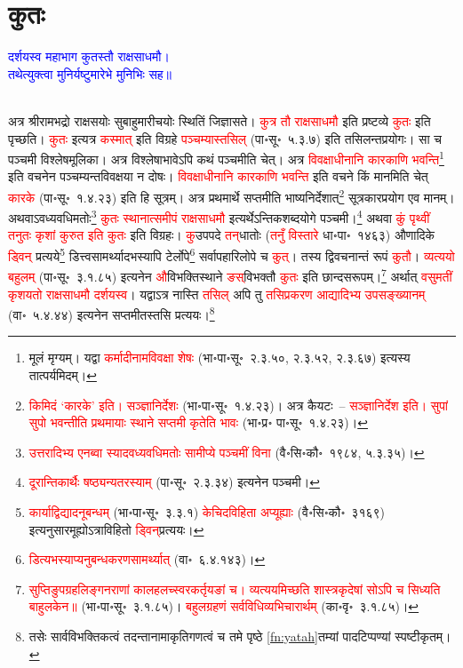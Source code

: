 \section[कुतः]{कुतः}
\centering\textcolor{blue}{दर्शयस्व महाभाग कुतस्तौ राक्षसाधमौ।\nopagebreak\\
तथेत्युक्त्वा मुनिर्यष्टुमारेभे मुनिभिः सह॥}\nopagebreak\\
\\
\begin{sloppypar}\justifying\noindent\hspace{10mm} अत्र श्रीरामभद्रो राक्षसयोः सुबाहु\-मारीचयोः स्थितिं जिज्ञासते। \textcolor{red}{कुत्र तौ राक्षसाधमौ} इति प्रष्टव्ये \textcolor{red}{कुतः} इति पृच्छति। \textcolor{red}{कुतः} इत्यत्र \textcolor{red}{कस्मात्} इति विग्रहे \textcolor{red}{पञ्चम्यास्तसिल्} (पा॰सू॰~५.३.७) इति तसिलन्त\-प्रयोगः। सा च पञ्चमी विश्लेष\-मूलिका। अत्र विश्लेषाभावेऽपि कथं पञ्चमीति चेत्। अत्र \textcolor{red}{विवक्षाधीनानि कारकाणि भवन्ति}\footnote{मूलं मृग्यम्। यद्वा \textcolor{red}{कर्मादीनामविवक्षा शेषः} (भा॰पा॰सू॰~२.३.५०, २.३.५२, २.३.६७) इत्यस्य तात्पर्यमिदम्।} इति वचनेन पञ्चम्यन्त\-विवक्षया न दोषः। \textcolor{red}{विवक्षाधीनानि कारकाणि भवन्ति} इति वचने किं मानमिति चेत् \textcolor{red}{कारके} (पा॰सू॰~१.४.२३) इति हि सूत्रम्। अत्र प्रथमार्थे सप्तमीति भाष्य\-निर्देशात्\footnote{\textcolor{red}{किमिदं ‘कारके’ इति। सञ्ज्ञानिर्देशः} (भा॰पा॰सू॰~१.४.२३)। अत्र कैयटः~– \textcolor{red}{सञ्ज्ञानिर्देश इति। सुपां सुपो भवन्तीति प्रथमायाः स्थाने सप्तमी कृतेति भावः} (भा॰प्र॰ पा॰सू॰~१.४.२३)।} सूत्रकार\-प्रयोग एव मानम्। अथवाऽवध्यवधिमतोः\footnote{\textcolor{red}{उत्तरादिभ्य एनब्वा स्यादवध्यवधिमतोः सामीप्ये पञ्चमीं विना} (वै॰सि॰कौ॰~१९८४, ५.३.३५)।} \textcolor{red}{कुतः स्थानात्समीपं राक्षसाधमौ} इत्यर्थेऽन्तिक\-शब्द\-योगे पञ्चमी।\footnote{ \textcolor{red}{दूरान्तिकार्थैः षष्ठ्यन्यतरस्याम्} (पा॰सू॰~२.३.३४) इत्यनेन पञ्चमी।}
अथवा \textcolor{red}{कुं पृथ्वीं तनुतः कृशां कुरुत इति कुतः} इति विग्रहः। \textcolor{red}{कु}\-उपपदे \textcolor{red}{तन्‌}\-धातोः (\textcolor{red}{तनुँ विस्तारे} धा॰पा॰~१४६३) औणादिके \textcolor{red}{ड्विन्} प्रत्यये\footnote{\textcolor{red}{कार्याद्विद्यादनूबन्धम्} (भा॰पा॰सू॰~३.३.१) \textcolor{red}{केचिदविहिता अप्यूह्याः} (वै॰सि॰कौ॰~३१६९) इत्यनुसारमूह्योऽ\-त्राविहितो \textcolor{red}{ड्विन्‌}\-प्रत्ययः।} डित्त्व\-सामर्थ्यादभस्यापि टेर्लोपे\footnote{\textcolor{red}{डित्यभस्याप्यनु\-बन्धकरण\-सामर्थ्यात्} (वा॰~६.४.१४३)।} सर्वापहारि\-लोपे च \textcolor{red}{कुत्}। तस्य द्विवचनान्तं रूपं \textcolor{red}{कुतौ}। \textcolor{red}{व्यत्ययो बहुलम्} (पा॰सू॰~३.१.८५) इत्यनेन \textcolor{red}{औ}\-विभक्ति\-स्थाने \textcolor{red}{ङस्‌}\-विभक्तौ \textcolor{red}{कुतः} इति छान्दस\-रूपम्।\footnote{\textcolor{red}{सुप्तिङुपग्रह\-लिङ्गनराणां कालहलच्स्वर\-कर्तृयङां च। व्यत्ययमिच्छति शास्त्रकृदेषां सोऽपि च सिध्यति बाहुलकेन॥} (भा॰पा॰सू॰~३.१.८५)। \textcolor{red}{बहुलग्रहणं सर्वविधि\-व्यभिचारार्थम्} (का॰वृ॰~३.१.८५)।} अर्थात् \textcolor{red}{वसुमतीं कृशयतो राक्षसाधमौ दर्शयस्व}।
यद्वाऽत्र नास्ति \textcolor{red}{तसिल्} अपि तु \textcolor{red}{तसि\-प्रकरण आद्यादिभ्य उपसङ्ख्यानम्} (वा॰~५.४.४४) इत्यनेन सप्तमीतस्तसि प्रत्ययः।\footnote{तसेः सार्व\-विभक्तिकत्वं तदन्तानामाकृति\-गणत्वं च \pageref{fn:yatah}तमे पृष्ठे \ref{fn:yatah}तम्यां पादटिप्पण्यां स्पष्टीकृतम्।
}\end{sloppypar}
